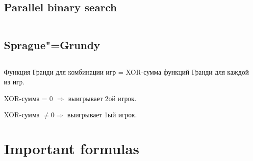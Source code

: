 ﻿\documentclass[10pt,twocolumn,oneside]{article}
\begin{document}
\subsection{Parallel binary search}
\inputminted[breaklines]{cpp}{Other algorithms/parallel binsearch.cpp}
\subsection{Sprague"=Grundy}
\inputminted[breaklines]{cpp}{Other algorithms/sprague-grundy.cpp}

Функция Гранди для комбинации игр = XOR-сумма функций Гранди для каждой из игр.

XOR-сумма = 0 $\Rightarrow$ выигрывает 2ой игрок.

XOR-сумма $\ne 0 \Rightarrow$ выигрывает 1ый игрок.

\section{Important formulas}

\end{document}
